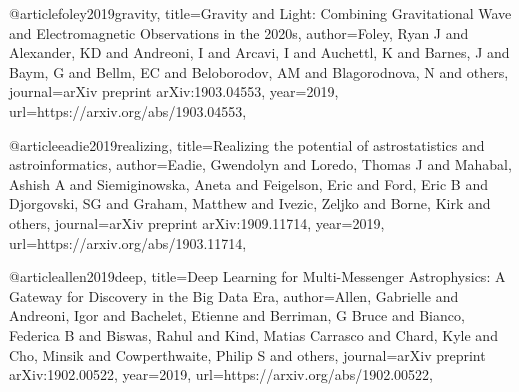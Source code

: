 
@article{foley2019gravity,
  title={Gravity and Light: Combining Gravitational Wave and Electromagnetic Observations in the 2020s},
  author={Foley, Ryan J and Alexander, KD and Andreoni, I and Arcavi, I and Auchettl, K and Barnes, J and Baym, G and Bellm, EC and Beloborodov, AM and Blagorodnova, N and others},
  journal={arXiv preprint arXiv:1903.04553},
  year={2019},
  url={https://arxiv.org/abs/1903.04553},
}

@article{eadie2019realizing,
  title={Realizing the potential of astrostatistics and astroinformatics},
  author={Eadie, Gwendolyn and Loredo, Thomas J and Mahabal, Ashish A and Siemiginowska, Aneta and Feigelson, Eric and Ford, Eric B and Djorgovski, SG and Graham, Matthew and Ivezic, Zeljko and Borne, Kirk and others},
  journal={arXiv preprint arXiv:1909.11714},
  year={2019},
  url={https://arxiv.org/abs/1903.11714},
}

@article{allen2019deep,
  title={Deep Learning for Multi-Messenger Astrophysics: A Gateway for Discovery in the Big Data Era},
  author={Allen, Gabrielle and Andreoni, Igor and Bachelet, Etienne and Berriman, G Bruce and Bianco, Federica B and Biswas, Rahul and Kind, Matias Carrasco and Chard, Kyle and Cho, Minsik and Cowperthwaite, Philip S and others},
  journal={arXiv preprint arXiv:1902.00522},
  year={2019},
  url={https://arxiv.org/abs/1902.00522},
}



